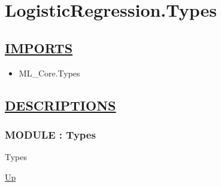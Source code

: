 \chapter*{LogisticRegression.Types}
\hypertarget{ecldoc:toc:LogisticRegression.Types}{}

\section*{\underline{IMPORTS}}
\begin{itemize}
\item ML\_Core.Types
\end{itemize}

\section*{\underline{DESCRIPTIONS}}
\subsection*{MODULE : Types}
\hypertarget{ecldoc:LogisticRegression.Types}{}
\begin{minipage}[t]{\textwidth}
\begin{flushleft}
 Types 
\end{flushleft}
\end{minipage}
\hyperlink{ecldoc:toc:LogisticRegression}{Up}

